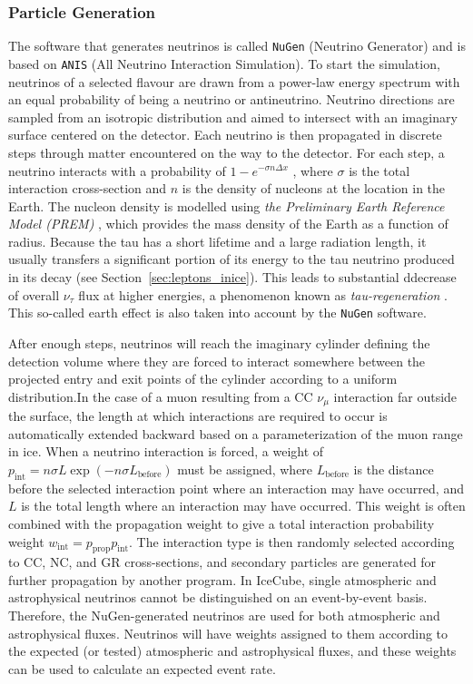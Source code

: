 \subsubsection*{Particle Generation}
The software that generates neutrinos is called \texttt{NuGen} (Neutrino Generator) and is based on \texttt{ANIS} (All Neutrino Interaction Simulation). To start the simulation, neutrinos of a selected flavour are drawn from a power-law energy spectrum with an equal probability of being a neutrino or antineutrino. Neutrino directions are sampled from an isotropic distribution and aimed to intersect with an imaginary surface centered on the detector. Each neutrino is then propagated in discrete steps through matter encountered on the way to the detector. For each step, a neutrino interacts with a probability of $1 - e^{-\sigma n \Delta x}$ , where $\sigma$ is the total interaction cross-section and $n$ is the density of nucleons at the location in the Earth. The nucleon density is modelled using \emph{the Preliminary Earth Reference Model (PREM)} , which provides the mass density of the Earth as a function of radius. Because the tau has a short lifetime and a large radiation length, it usually transfers a significant portion of its energy to the tau neutrino produced in its decay (see Section~\ref{sec:leptons_inice}). This leads to substantial ddecrease of overall $\nu_{\tau}$ flux at higher energies, a phenomenon known as \emph{tau-regeneration} . This so-called earth effect is also taken into account by the \texttt{NuGen} software. \par
After enough steps, neutrinos will reach the imaginary cylinder defining the detection volume where they are forced to interact somewhere between the projected entry and exit points of the cylinder according to a uniform distribution.In the case of a muon resulting from a CC $\nu_\mu$ interaction far outside the surface, the length at which interactions are required to occur is automatically extended backward based on a parameterization of the muon range in ice. When a neutrino interaction is forced, a weight of $p_{\text{int}} = n\sigma L \exp(-n\sigma L_{\text{before}})$ must be assigned, where $L_{\text{before}}$ is the distance before the selected interaction point where an interaction may have occurred, and $L$ is the total length where an interaction may have occurred. This weight is often combined with the propagation weight to give a total interaction probability weight $w_{\text{int}} = p_{\text{prop}} p_{\text{int}}$. The interaction type is then randomly selected according to CC, NC, and GR cross-sections, and secondary particles are generated for further propagation by another program. In IceCube, single atmospheric and astrophysical neutrinos cannot be distinguished on an event-by-event basis. Therefore, the NuGen-generated neutrinos are used for both atmospheric and astrophysical fluxes. Neutrinos will have weights assigned to them according to the expected (or tested) atmospheric and astrophysical fluxes, and these weights can be used to calculate an expected event rate.
 

